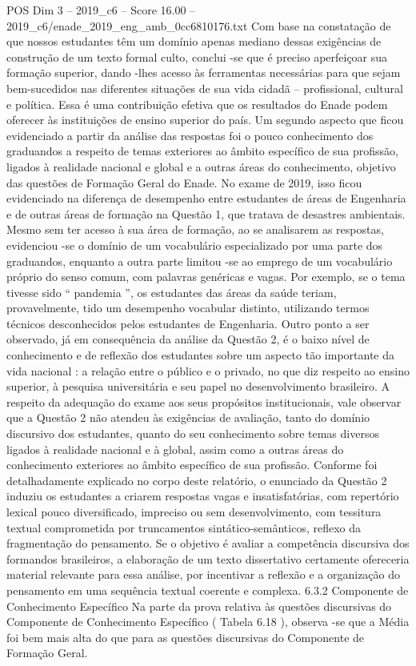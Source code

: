 \begin{textsample}{POS Dim 3 – 2019\_c6 – Score 16.00 – 2019\_c6/enade\_2019\_eng\_amb\_0cc6810176.txt}
Com base na constatação de que nossos estudantes têm um domínio apenas mediano dessas exigências de construção de um texto formal culto, conclui -se que é preciso aperfeiçoar sua formação superior, dando -lhes acesso às ferramentas necessárias para que sejam bem-sucedidos nas diferentes situações de sua vida cidadã – profissional, cultural e política.
Essa é uma contribuição efetiva que os resultados do Enade podem oferecer às instituições de ensino superior do país.
Um segundo aspecto que ficou evidenciado a partir da análise das respostas foi o pouco conhecimento dos graduandos a respeito de temas exteriores ao âmbito específico de sua profissão, ligados à realidade nacional e global e a outras áreas do conhecimento, objetivo das questões de Formação Geral do Enade.
No exame de 2019, isso ficou evidenciado na diferença de desempenho entre estudantes de áreas de Engenharia e de outras áreas de formação na Questão 1, que tratava de desastres ambientais.
Mesmo sem ter acesso à sua área de formação, ao se analisarem as respostas, evidenciou -se o domínio de um vocabulário especializado por uma parte dos graduandos, enquanto a outra parte limitou -se ao emprego de um vocabulário próprio do senso comum, com palavras genéricas e vagas.
Por exemplo, se o tema tivesse sido “ pandemia ”, os estudantes das áreas da saúde teriam, provavelmente, tido um desempenho vocabular distinto, utilizando termos técnicos desconhecidos pelos estudantes de Engenharia.
Outro ponto a ser observado, já em consequência da análise da Questão 2, é o baixo nível de conhecimento e de reflexão dos estudantes sobre um aspecto tão importante da vida nacional : a relação entre o público e o privado, no que diz respeito ao ensino superior, à pesquisa universitária e seu papel no desenvolvimento brasileiro.
A respeito da adequação do exame aos seus propósitos institucionais, vale observar que a Questão 2 não atendeu às exigências de avaliação, tanto do domínio discursivo dos estudantes, quanto do seu conhecimento sobre temas diversos ligados à realidade nacional e à global, assim como a outras áreas do conhecimento exteriores ao âmbito específico de sua profissão.
Conforme foi detalhadamente explicado no corpo deste relatório, o enunciado da Questão 2 induziu os estudantes a criarem respostas vagas e insatisfatórias, com repertório lexical pouco diversificado, impreciso ou sem desenvolvimento, com tessitura textual comprometida por truncamentos sintático-semânticos, reflexo da fragmentação do pensamento.
Se o objetivo é avaliar a competência discursiva dos formandos brasileiros, a elaboração de um texto dissertativo certamente ofereceria material relevante para essa análise, por incentivar a reflexão e a organização do pensamento em uma sequência textual coerente e complexa. 6.3.2 Componente de Conhecimento Específico Na parte da prova relativa às questões discursivas do Componente de Conhecimento Específico ( Tabela 6.18 ), observa -se que a Média foi bem mais alta do que para as questões discursivas do Componente de Formação Geral.

\end{textsample}
